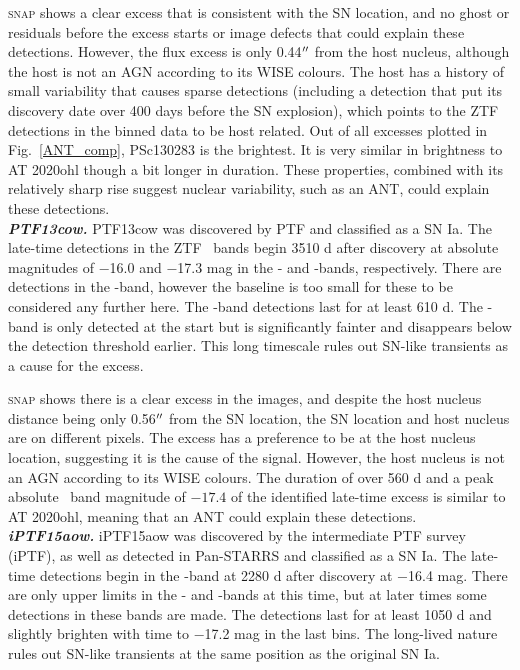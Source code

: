 \documentclass[a4paper,oneside,12pt, class=Latex/Classes/PhDthesisPSnPDF, crop=false]{standalone}
\begin{document}
\textsc{snap} shows a clear excess that is consistent with the SN location, and no ghost or residuals before the excess starts or image defects that could explain these detections. However, the flux excess is only 0.44$^{\prime\prime}$ from the host nucleus, although the host is not an AGN according to its WISE colours. The host has a history of small variability that causes sparse detections (including a detection that put its discovery date over 400 days before the SN explosion), which points to the ZTF detections in the binned data to be host related. Out of all excesses plotted in Fig.~\ref{ANT_comp}, PSc130283 is the brightest. It is very similar in brightness to AT 2020ohl though a bit longer in duration. These properties, combined with its relatively sharp rise suggest nuclear variability, such as an ANT, could explain these detections.\\


\textit{\textbf{PTF13cow.}}
PTF13cow was discovered by PTF and classified as a SN Ia. The late-time detections in the ZTF \ztfg\ztfr\ztfi\ bands begin 3510 d after discovery at absolute magnitudes of $-$16.0 and $-$17.3 mag in the \ztfg- and \ztfr-bands, respectively. There are detections in the \ztfi-band, however the baseline is too small for these to be considered any further here. The \ztfr-band detections last for at least 610 d. The \ztfg-band is only detected at the start but is significantly fainter and disappears below the detection threshold earlier. This long timescale rules out SN-like transients as a cause for the excess.

\textsc{snap} shows there is a clear excess in the images, and despite the host nucleus distance being only 0.56$^{\prime\prime}$ from the SN location, the SN location and host nucleus are on different pixels. The excess has a preference to be at the host nucleus location, suggesting it is the cause of the signal. However, the host nucleus is not an AGN according to its WISE colours. The duration of over 560 d and a peak absolute \ztfr\ band magnitude of $-17.4$ of the identified late-time excess is similar to AT 2020ohl, meaning that an ANT could explain these detections.\\


\textit{\textbf{iPTF15aow.}}
iPTF15aow was discovered by the intermediate PTF survey (iPTF), as well as detected in Pan-STARRS and classified as a SN Ia. The late-time detections begin in the \ztfr-band at 2280 d after discovery at $-$16.4 mag. There are only upper limits in the \ztfg- and \ztfi-bands at this time, but at later times some detections in these bands are made. The detections last for at least 1050 d and slightly brighten with time to $-$17.2 mag in the last bins. The long-lived nature rules out SN-like transients at the same position as the original SN Ia. 
\end{document}
